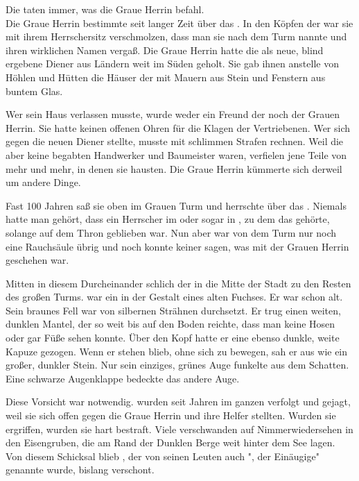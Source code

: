 \begin{Large}
Die {\Bangiri} taten immer, was die Graue Herrin befahl.\\
Die Graue Herrin bestimmte seit langer Zeit über das {\Enland}. In den Köpfen der {\Enlaender} war sie mit ihrem Herrschersitz verschmolzen, dass man sie nach dem Turm nannte und ihren wirklichen Namen vergaß. Die Graue Herrin hatte die {\Bangiri} als neue, blind ergebene Diener aus Ländern weit im Süden geholt. Sie gab ihnen anstelle von Höhlen und Hütten die Häuser der {\Enlaender} mit Mauern aus Stein und Fenstern aus buntem Glas. 

Wer sein Haus verlassen musste, wurde weder ein Freund der {\Bangiri} noch der Grauen Herrin. Sie hatte keinen offenen Ohren für die Klagen der Vertriebenen. Wer sich gegen die neuen Diener stellte, musste mit schlimmen Strafen rechnen. Weil die {\Bangiri} aber keine begabten Handwerker und Baumeister waren, verfielen jene Teile von {\Tern} mehr und mehr, in denen sie hausten. Die Graue Herrin kümmerte sich derweil um andere Dinge. 

Fast 100 Jahren saß sie oben im Grauen Turm und herrschte über das {\Enland}. Niemals hatte man gehört, dass ein Herrscher im {\Enland} oder sogar in {\Rhingell}, zu dem das {\Enland} gehörte, solange auf dem Thron geblieben war. Nun aber war von dem Turm nur noch eine Rauchsäule übrig und noch konnte keiner sagen, was mit der Grauen Herrin geschehen war. 

Mitten in diesem Durcheinander schlich {\Eno} der {\Schattenlaufer} in die Mitte der Stadt zu den Resten des großen Turms. {\Eno} war ein {\Enlaender} in der Gestalt eines alten Fuchses. Er war schon alt. Sein braunes Fell war von silbernen Strähnen durchsetzt. Er trug einen weiten, dunklen Mantel, der so weit bis auf den Boden reichte, dass man keine Hosen oder gar Füße sehen konnte. Über den Kopf hatte er eine ebenso dunkle, weite Kapuze gezogen. Wenn er stehen blieb, ohne sich zu bewegen, sah er aus wie ein großer, dunkler Stein. Nur sein einziges, grünes Auge funkelte aus dem Schatten. Eine schwarze Augenklappe bedeckte das andere Auge.

Diese Vorsicht war notwendig. {\Schattenlaufer} wurden seit Jahren im ganzen {\Enland} verfolgt und gejagt, weil sie sich offen gegen die Graue Herrin und ihre Helfer stellten. Wurden sie ergriffen, wurden sie hart bestraft. Viele verschwanden auf Nimmerwiedersehen in den Eisengruben, die am Rand der Dunklen Berge weit hinter dem See lagen.\\
Von diesem Schicksal blieb {\Eno}, der von seinen Leuten auch "{\Eno}, der Einäugige" genannte wurde, bislang verschont. 


\end{Large}
